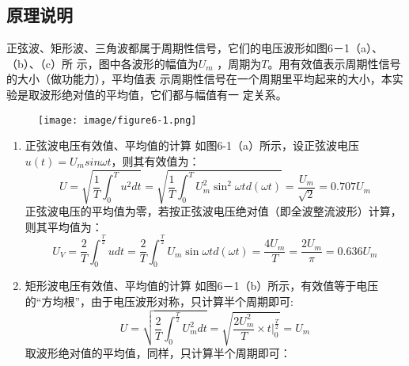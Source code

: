 \documentclass[UTF8]{article}
\begin{document}
        \subsection{原理说明}
            \noindent\hspace{2em}正弦波、矩形波、三角波都属于周期性信号，它们的电压波形如图6－1（a）、（b）、（c）所
            示，图中各波形的幅值为$U_m$
            ，周期为$T$。用有效值表示周期性信号的大小（做功能力），平均值表
            示周期性信号在一个周期里平均起来的大小，本实验是取波形绝对值的平均值，它们都与幅值有一
            定关系。 
            \begin{figure}[H]
                \centering
                \texttt{[image: image/figure6-1.png]}
                \caption{}
            \end{figure}
            \begin{enumerate}[label=\textbf{\arabic*}.]
                \item 正弦波电压有效值、平均值的计算
                \newline 如图6-1（a）所示，设正弦波电压$u(t)=U_msin\omega t$，则其有效值为：
                \begin{equation*}
                    U = \sqrt{\frac{1}{T}\int_{0}^{T}u^2 dt} = \sqrt{\frac{1}{T} \int_{0}^{T} U_{m}^{2} \sin ^2 \omega 
                    t d(\omega t)} = \frac{U_m}{\sqrt{2}} = 0.707U_m
                \end{equation*} 
                正弦波电压的平均值为零，若按正弦波电压绝对值（即全波整流波形）计算，则其平均值为：
                \begin{equation*}
                    U_{V} = \frac{2}{T} \int_{0}^{\frac{T}{2}} udt
                    = \frac{2}{T} \int_{0}^{\frac{T}{2}} U_m \sin \omega t d(\omega t) 
                    = \frac{4U_m}{T} = \frac{2U_m}{\pi} = 0.636U_m
                \end{equation*} 
                \item 矩形波电压有效值、平均值的计算
                \newline 如图6－1（b）所示，有效值等于电压的“方均根”，由于电压波形对称，只计算半个周期即可:
                \begin{equation*}
                    U = \sqrt{\frac{2}{T}\int_{0}^{\frac{T}{2}}U_{m}^{2} dt} 
                    = \sqrt{\frac{2U_{m}^{2}}{T} \times t \big|_{0}^{\frac{T}{2}}} = U_m
                \end{equation*}
                取波形绝对值的平均值，同样，只计算半个周期即可：
                \begin{equation*}

\end{equation*}
\end{enumerate}
\end{document}
